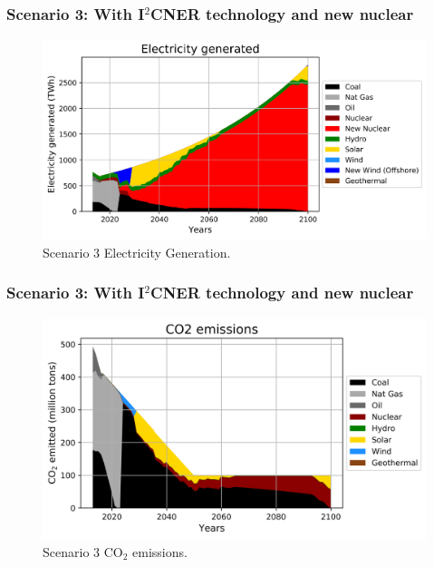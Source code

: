 \begin{frame}
  \frametitle{Scenario 3: With I$^2$CNER technology and new nuclear}
  \begin{figure}[htbp!]
    \begin{center}
      \includegraphics[scale=0.6]{./images/i2cner_nuc_elc}
    \end{center}
          \caption{Scenario 3 Electricity Generation.}
    \label{s3e}
  \end{figure}
\end{frame}

\begin{frame}
  \frametitle{Scenario 3: With I$^2$CNER technology and new nuclear}
  \begin{figure}[htbp!]
    \begin{center}
      \includegraphics[scale=0.6]{./images/i2cner_nuc_co2}
    \end{center}
          \caption{Scenario 3 CO$_2$ emissions.}
    \label{s3c}
  \end{figure}

\end{frame}